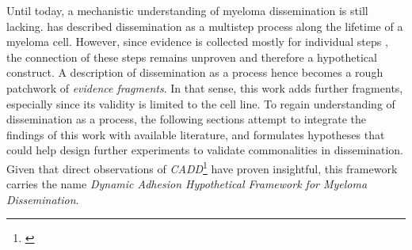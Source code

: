 %
\label{sec:discussion_framework}%
Until today, a mechanistic understanding of myeloma dissemination is still
lacking. \citet{zeissigTumourDisseminationMultiple2020} has described
dissemination as a multistep process along the lifetime of a myeloma cell.
However, since evidence is collected mostly for individual steps
, the connection of these steps
remains unproven and therefore a hypothetical construct. A description of
dissemination as a process hence becomes a rough patchwork of \emph{evidence
      fragments}. In that sense, this work adds further fragments, especially since
its validity is limited to the \INA cell line. To regain understanding of
dissemination as a process, the following sections attempt to integrate the
findings of this work with available literature, and formulates hypotheses that
could help design further experiments to validate commonalities in
dissemination. Given that direct observations of
\emph{\ac{CADD}}\footnote{\footcadd\label{foot:cadd}} have proven insightful,
this framework carries the name \emph{Dynamic Adhesion Hypothetical Framework
      for Myeloma Dissemination}.


\newcommand{\caddpredictions}{%
      \textit{CADD Enabling Predictions:} \ac{CADD}
}%
\newcommand{\caddpredictionstitle}{%
      \textit{Hypothesis 1}: CADD Predicts Dissemination %
}%


\newcommand{\caddadaptation}{ %
      \textit{CADD Adaptation:} Myeloma cells adapt their \ac{CADD} in response to
      interactions with different microenvironmental niches faced during
      dissemination. %
}
\newcommand{\caddadaptationtitle}{ %
      \textit{Hypothesis 2}: CADD Adaptation %
}%


\newcommand{\caddadaptibility}{ %
      \textit{CADD Adaptability:} Highly adaptive \ac{CADD} is a hallmark of
      aggressive myeloma %
}%
\newcommand{\caddadaptabilitytitle}{ %
      \textit{Hypothesis 3}: Dynamic Change in Cell Adhesion Behaviour is a Hallmark of
      Aggressive Myeloma %
}%


\newcommand{\cadddiversity}{%
      \textit{CADD Diversity:} \ac{CADD} is highly diverse, both in patients and
      cell lines %
}%
\newcommand{\cadddiversitytitle}{ %
      \textit{Hypothesis 4}: CADD is Highly Diverse %
}%


\newcommand{\caddtrigger}{%
      \textit{CADD Triggering Detachment:} Detachment can be triggered by multiple
      cues of varying nature, including external mechanical forces, cell
      division, loss of \ac{CAM} expression, or even pure chance. }%
\newcommand{\caddtriggertitle}{ %
      \textit{Hypothesis 5}: Detachment Can be Triggered by  Multiple Cues of Varying
      Nature %
}%


